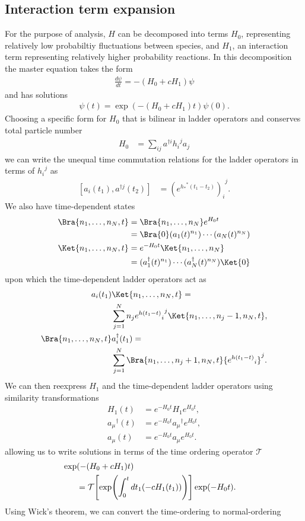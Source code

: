 {\subsection{Interaction term expansion}
For the purpose of analysis, $H$ can be decomposed into terms $H_0$, representing relatively low probabiltiy fluctuations between species, and $H_1$, an interaction term representing relatively higher probability reactions. In this decomposition the master equation takes the form
\begin{align*}
\frac{d \psi}{dt} = -(H_0+cH_1)\psi
\end{align*}
and has solutions
\begin{align*}
\psi(t) = \exp(-(H_0+cH_1)t)\psi(0).
\end{align*}
Choosing a specific form for $H_0$ that is bilinear in ladder operators and conserves total particle number
\begin{align*}
H_0 &= \sum_{ij} a^{\dagger i} {h_{i}}^{j} a_{j}
\end{align*}
we can write the unequal time commutation relations for the ladder operators in terms of ${h_{i}}^{j}$ as
\begin{align*}
\left[ a_{i}(t_1),a^{\dagger j}(t_2) \right] &= {\left(e^{{h_{*}}^{*} (t_1 - t_2)}\right)_{i}}^{j}.
\end{align*}
We also have time-dependent states
\begin{align*}
\Bra{n_1,\ldots,n_N,t} &= \Bra{n_1,\ldots,n_N} e^{H_0 t} \cr
&= \Bra{0} (a_1 (t)^{n_1}) \cdots (a_N (t)^{n_N})\\
\Ket{n_1,\ldots,n_N,t} &= e^{-H_0 t} \Ket{n_1,\ldots,n_N} \cr
&= (a^{\dagger}_1 (t)^{n_1}) \cdots (a^{\dagger}_N (t)^{n_N})\Ket{0}
\end{align*}
upon which the time-dependent ladder operators act as
\begin{align*}
a_i(t_1) &\Ket{n_1,\ldots,n_N,t} = \cr
&\sum_{j=1}^N n_j {{e^{h(t_1-t)}}_{i}}^{j} \Ket{n_1,\ldots,n_j-1,n_N,t},\\
\Bra{n_1,\ldots,n_N,t}& a^{\dagger}_i(t_1)  = \cr
&\sum_{j=1}^N \Bra{n_1,\ldots,n_j+1,n_N,t} {{e^{h(t_1-t)}}_{i}}^{j}.
\end{align*}
We can then reexpress $H_1$ and the time-dependent ladder operators using similarity transformations
\begin{align*}
H_1(t) &= e^{-H_0 t} H_1 e^{H_0 t},\\
{a_{\mu}}^{\dagger}(t) &= e^{-H_0 t} {a_{\mu}}^{\dagger} e^{H_0 t},\\
{a_{\mu}}(t) &= e^{-H_0 t} {a_{\mu}} e^{H_0 t}.
\end{align*}
allowing us to write solutions in terms of the time ordering operator $\mathcal{T}$
\begin{align*}
\exp &(-(H_0 + cH_1)t) \cr
&= \mathcal{T} \Biggl[ \exp \Biggl(\int_0^t dt_1 (-c H_1(t_1))\Biggr) \Biggr] \exp(-H_0 t).
\end{align*}
Using Wick's theorem, we can convert the time-ordering to normal-ordering


}
